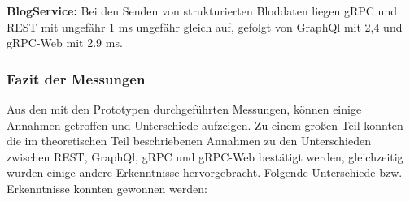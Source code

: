 \textbf{BlogService:}  
Bei den Senden von strukturierten Bloddaten liegen gRPC und REST mit ungefähr 1 ms ungefähr gleich auf, gefolgt von GraphQl mit 2,4 und gRPC-Web mit 2.9 ms.

\clearpage
\subsubsection*{Fazit der Messungen}
Aus den mit den Prototypen durchgeführten Messungen, können einige Annahmen getroffen und Unterschiede aufzeigen. Zu einem großen Teil konnten die im theoretischen Teil beschriebenen Annahmen zu den Unterschieden zwischen REST, GraphQl, gRPC und gRPC-Web bestätigt werden, gleichzeitig wurden einige andere Erkenntnisse hervorgebracht. Folgende Unterschiede bzw. Erkenntnisse konnten gewonnen werden:

\chapterend


